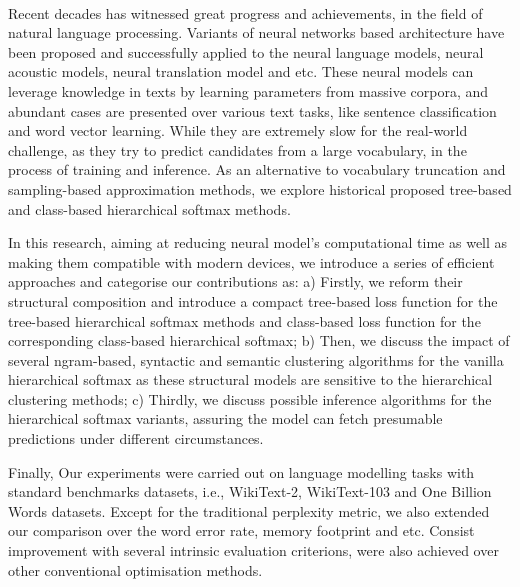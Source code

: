\documentclass[master,openright,oneside,color]{buaathesis}
\begin{document}
\begin{eabstract}
~\

Recent decades has witnessed great progress and achievements, in the field of natural language processing. Variants of neural networks based architecture have been proposed and successfully applied to the neural language models, neural acoustic models, neural translation model and etc. These neural models can leverage knowledge in texts by learning parameters from massive corpora, and abundant cases are presented over various text tasks, like sentence classification and word vector learning. While they are extremely slow for the real-world challenge, as they try to predict candidates from a large vocabulary, in the process of training and inference. As an alternative to vocabulary truncation and sampling-based approximation methods, we explore historical proposed tree-based and class-based hierarchical softmax methods.

In this research, aiming at reducing neural model's computational time as well as making them compatible with modern devices, we introduce a series of efficient approaches and categorise our contributions as: a) Firstly, we reform their structural composition and introduce a compact tree-based loss function for the tree-based hierarchical softmax methods and class-based loss function for the corresponding class-based hierarchical softmax; b) Then, we discuss the impact of several ngram-based, syntactic and semantic clustering algorithms for the vanilla hierarchical softmax as these structural models are sensitive to the hierarchical clustering methods; c) Thirdly, we discuss possible inference algorithms for the hierarchical softmax variants, assuring the model can fetch presumable predictions under different circumstances.

Finally, Our experiments were carried out on language modelling tasks with standard benchmarks datasets, i.e., WikiText-2, WikiText-103 and One Billion Words datasets. Except for the traditional perplexity metric, we also extended our comparison over the word error rate, memory footprint and etc. Consist improvement with several intrinsic evaluation criterions, were also achieved over other conventional optimisation methods.
\end{eabstract}
\tableofcontents
\listoffigures
\listoftables

\mainmatter
\pagestyle{mainmatter}








\cleardoublepage
{}
{}
\nocite{*}

\cleardoublepage


\backmatter

\end{document}
